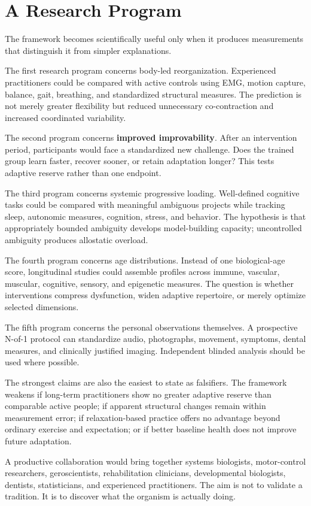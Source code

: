 \chapter{A Research Program}\label{chapter-18-a-research-program}

The framework becomes scientifically useful only when it produces measurements that distinguish it from simpler explanations.

The first research program concerns body-led reorganization. Experienced practitioners could be compared with active controls using EMG, motion capture, balance, gait, breathing, and standardized structural measures. The prediction is not merely greater flexibility but reduced unnecessary co-contraction and increased coordinated variability.

The second program concerns \textbf{improved improvability}. After an intervention period, participants would face a standardized new challenge. Does the trained group learn faster, recover sooner, or retain adaptation longer? This tests adaptive reserve rather than one endpoint.

The third program concerns systemic progressive loading. Well-defined cognitive tasks could be compared with meaningful ambiguous projects while tracking sleep, autonomic measures, cognition, stress, and behavior. The hypothesis is that appropriately bounded ambiguity develops model-building capacity; uncontrolled ambiguity produces allostatic overload.

The fourth program concerns age distributions. Instead of one biological-age score, longitudinal studies could assemble profiles across immune, vascular, muscular, cognitive, sensory, and epigenetic measures. The question is whether interventions compress dysfunction, widen adaptive repertoire, or merely optimize selected dimensions.

The fifth program concerns the personal observations themselves. A prospective N-of-1 protocol can standardize audio, photographs, movement, symptoms, dental measures, and clinically justified imaging. Independent blinded analysis should be used where possible.

The strongest claims are also the easiest to state as falsifiers. The framework weakens if long-term practitioners show no greater adaptive reserve than comparable active people; if apparent structural changes remain within measurement error; if relaxation-based practice offers no advantage beyond ordinary exercise and expectation; or if better baseline health does not improve future adaptation.

A productive collaboration would bring together systems biologists, motor-control researchers, geroscientists, rehabilitation clinicians, developmental biologists, dentists, statisticians, and experienced practitioners. The aim is not to validate a tradition. It is to discover what the organism is actually doing.
